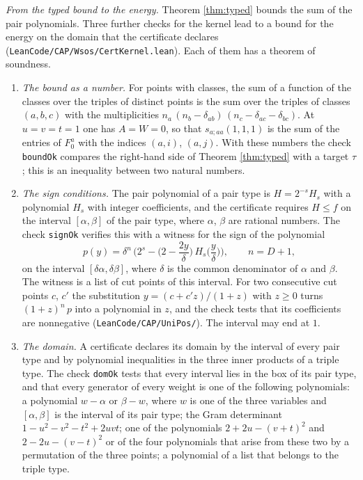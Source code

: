 \documentclass[reqno,a4paper,11pt]{amsart}
\numberwithin{equation}{section}
\newcommand{\lean}[1]{\texttt{#1}}
\newcommand{\file}[1]{\nolinkurl{#1}}
\begin{document}
\emph{From the typed bound to the energy.} Theorem \ref{thm:typed} bounds the sum of the pair polynomials. Three further checks for the kernel lead to a bound for the energy on the domain that the certificate declares (\file{LeanCode/CAP/Wsos/CertKernel.lean}). Each of them has a theorem of soundness.
\begin{enumerate}
    \item[(K1)] \emph{The bound as a number.} For points with classes, the sum of a function of the classes over the triples of distinct points is the sum over the triples of classes $(a,b,c)$ with the multiplicities $n_a \, (n_b - \delta_{ab}) \, (n_c - \delta_{ac} - \delta_{bc})$. At $u = v = t = 1$ one has $A = W = 0$, so that $s_{a;aa}(1,1,1)$ is the sum of the entries of $F^a_0$ with the indices $(a,i)$, $(a,j)$. With these numbers the check \lean{boundOk} compares the right-hand side of Theorem \ref{thm:typed} with a target $\tau$; this is an inequality between two natural numbers.
    \item[(K2)] \emph{The sign conditions.} The pair polynomial of a pair type is $H = 2^{-s} H_s$ with a polynomial $H_s$ with integer coefficients, and the certificate requires $H \leq f$ on the interval $[\alpha, \beta]$ of the pair type, where $\alpha$, $\beta$ are rational numbers. The check \lean{signOk} verifies this with a witness for the sign of the polynomial
    $$
    p(y) = \delta^{n} \, \Big( 2^{s} - \Big(2 - \frac{2y}{\delta}\Big) \, H_s\Big(\frac{y}{\delta}\Big) \Big), \qquad n = D + 1,
    $$
    on the interval $[\delta \alpha, \delta \beta]$, where $\delta$ is the common denominator of $\alpha$ and $\beta$. The witness is a list of cut points of this interval. For two consecutive cut points $c$, $c'$ the substitution $y = (c + c' z)/(1 + z)$ with $z \geq 0$ turns $(1 + z)^n \, p$ into a polynomial in $z$, and the check tests that its coefficients are nonnegative (\file{LeanCode/CAP/UniPos/}). The interval may end at $1$.
    \item[(K3)] \emph{The domain.} A certificate declares its domain by the interval of every pair type and by polynomial inequalities in the three inner products of a triple type. The check \lean{domOk} tests that every interval lies in the box of its pair type, and that every generator of every weight is one of the following polynomials: a polynomial $w - \alpha$ or $\beta - w$, where $w$ is one of the three variables and $[\alpha, \beta]$ is the interval of its pair type; the Gram determinant $1 - u^2 - v^2 - t^2 + 2uvt$; one of the polynomials $2 + 2u - (v+t)^2$ and $2 - 2u - (v-t)^2$ or of the four polynomials that arise from these two by a permutation of the three points; a polynomial of a list that belongs to the triple type.
\end{enumerate}
\end{document}
